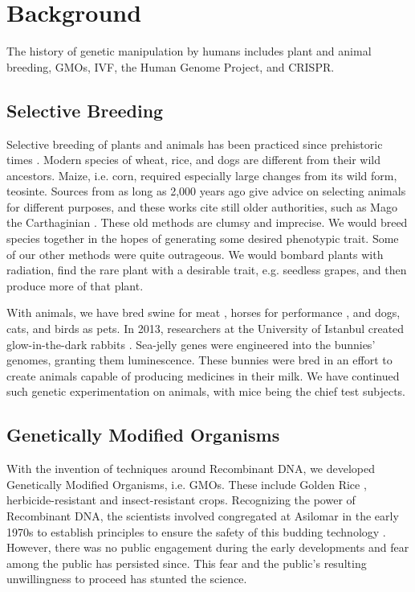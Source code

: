 \section{Background}
\label{sec:background}

The history of genetic manipulation by humans includes plant and animal breeding, GMOs, IVF, the Human Genome Project, and CRISPR.

\subsection{Selective Breeding}

Selective breeding of plants and animals has been practiced since prehistoric times \cite{Buffum1909}.
Modern species of wheat, rice, and dogs are different from their wild ancestors.
Maize, i.e. corn, required especially large changes from its wild form, teosinte.
Sources from as long as 2,000 years ago give advice on selecting animals for different purposes, and these works cite still older authorities, such as Mago the Carthaginian \cite{Lush2017}.
These old methods are clumsy and imprecise.
We would breed species together in the hopes of generating some desired phenotypic trait.
Some of our other methods were quite outrageous.
We would bombard plants with radiation, find the rare plant with a desirable trait, e.g. seedless grapes, and then produce more of that plant.

With animals, we have bred swine for meat \cite{OSU2011}, horses for performance \cite{Evans2000}, and dogs, cats, and birds as pets.
In 2013, researchers at the University of Istanbul created glow-in-the-dark rabbits \cite{Rojhan2013}.
Sea-jelly genes were engineered into the bunnies' genomes, granting them luminescence.
These bunnies were bred in an effort to create animals capable of producing medicines in their milk.
We have continued such genetic experimentation on animals, with mice being the chief test subjects.

\subsection{Genetically Modified Organisms}

With the invention of techniques around Recombinant DNA, we developed Genetically Modified Organisms, i.e. GMOs.
These include Golden Rice \cite{Xudong2000}, herbicide-resistant \cite{Funke2006} and insect-resistant \cite{Paine2005} crops.
Recognizing the power of Recombinant DNA, the scientists involved congregated at Asilomar in the early 1970s to establish principles to ensure the safety of this budding technology \cite{Berg1975}.
However, there was no public engagement during the early developments and fear among the public has persisted since.
This fear and the public's resulting unwillingness to proceed has stunted the science.

